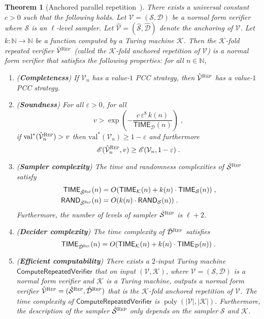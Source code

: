 \documentclass[11pt]{article}
\newtheorem{theorem}{Theorem}[section]
\theoremstyle{definition}
\newcommand{\N}{\ensuremath{\mathbb{N}}}
\newcommand{\mK}{\ensuremath{\mathcal{K}}}
\DeclareMathOperator{\poly}{poly}
\newcommand{\val}{\ensuremath{\mathrm{val}}}
\newcommand{\eps}{\varepsilon}
\newcommand{\abs}[1]{\left\vert {#1} \right\vert}
\newcommand{\sampler}{\mathcal{S}}
\newcommand{\decider}{\mathcal{D}}
\newcommand{\verifier}{\mathcal{V}}
\newcommand{\gamestyle}[1]{\ensuremath{\textsc{#1}}\xspace}
\newcommand{\Ent}{\mathscr{E}}
\renewcommand{\cal}[1]{\mathcal{#1}}
\newcommand{\TIME}{\mathsf{TIME}}
\newcommand{\RAND}{\mathsf{RAND}}
\newcommand{\tmstyle}[1]{\ensuremath{\mathsf{#1}}}
\newcommand{\ComputeParrepVerifier}{\tmstyle{ComputeRepeatedVerifier}}
\newcommand{\rep}{\gamestyle{Rep}}
\begin{document}
\begin{theorem}[Anchored parallel repetition~\cite{bavarian2017hardness}]
  \label{thm:anchored_parrep}
  There exists a universal constant $c > 0$ such that the following holds.
  Let $\verifier = (\sampler,\decider)$ be a normal form verifier where
  $\sampler$ is an $\ell$-level sampler.
  Let $\hat{\verifier} = (\hat{\sampler},\hat{\decider})$ denote the anchoring
  of $\verifier$.
  Let $k: \N \to \N$ be a function computed by a Turing machine $\mK$.
  Then the $\cal{K}$-fold repeated verifier $\hat{\verifier}^\rep$ (called the
  \emph{$\cal{K}$-fold anchored repetition of $\verifier$}) is a normal form
  verifier that satisfies the following properties: for all $n \in \N$,
  \begin{enumerate}
	\item \label{enu:pr-completeness} (\textbf{Completeness}) If $\verifier_n$ has
    a value-$1$ PCC strategy, then $\hat{\verifier}^{\rep}$ has a value-$1$ PCC
    strategy.

  \item \label{enu:pr-soundness} (\textbf{Soundness}) For all $\eps > 0$, for
    all
    \[
      v > \exp \left ( - \frac{c \, \eps^8 \, k(n)}{\TIME_\decider(n)} \right)\;,
    \]
    if $\val^*(\hat{\verifier}^\rep_n) > v$ then $\val^*(\verifier_n) \geq 1 -
    \eps$ and furthermore
    \[
      \Ent(\hat{\verifier}^\rep_n,v) \geq \Ent(\verifier_n,1 - \eps)\;.
    \]

  \item\label{enu:pr-sampler-complexity} (\textbf{Sampler complexity}) The time
    and randomness complexities of $\hat{\sampler}^\rep$ satisfy
    \begin{align*}
      \TIME_{\hat{\sampler}^\rep}(n) & = O(\TIME_{\mK}(n) + k(n) \cdot
      \TIME_\sampler(n))\;, \\
      \RAND_{\hat{\sampler}^\rep}(n) & = O(k(n) \cdot \RAND_\sampler(n))\;.
    \end{align*}
    Furthermore, the number of levels of sampler $\hat{\sampler}^\rep$ is
    $\ell+2$.
  \item \label{enu:pr-decider-complexity} (\textbf{Decider complexity}) The time
    complexity of $\hat{\decider}^\rep$ satisfies
    \[
      \TIME_{\hat{\decider}^\rep}(n) = O(\TIME_{\mK}(n) + k(n) \cdot
      \TIME_\decider(n))\;.
    \]

  \item\label{enu:pr-computability} (\textbf{Efficient computability}) There
    exists a $2$-input Turing machine $\ComputeParrepVerifier$ that on input
    $(\verifier, \cal{K})$, where $\verifier = (\sampler,\decider)$ is a normal
    form verifier and $\cal{K}$ is a Turing machine, outputs a normal form
    verifier $\hat{\verifier}^\rep = (\hat{\sampler}^\rep,\hat{\decider}^\rep)$
    that is the $\mK$-fold anchored repetition of $\verifier$.
    The time complexity of $\ComputeParrepVerifier$ is $\poly(\abs{\verifier},
    |\cal{K}|)$.
    Furthermore, the description of the sampler $\hat{\sampler}^\rep$ only
    depends on the sampler $\sampler$ and $\cal{K}$.
  \end{enumerate}
\end{theorem}
\end{document}
